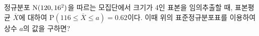 \noindent\begin{minipage}[t]{0.58\linewidth}\vspace{0pt}\raggedright 정규분포 $\mathrm{N}(120{,}\mkern3mu\mathopen{}16^2)$을 따르는 모집단에서 크기가 4인 표본을 임의추출할 때, 표본평균 $\overline{X}$에 대하여 $\mathrm{P}(116\le\overline{X}\le a)=0.62$이다. 이때 위의 표준정규분포표를 이용하여 상수 $a$의 값을 구하면?\end{minipage}\hfill\begin{minipage}[t]{0.4\linewidth}\vspace{0pt}\centering \resizebox{\ifdim\width>\linewidth\linewidth\else\width\fi}{!}{}\end{minipage}\par
{}
